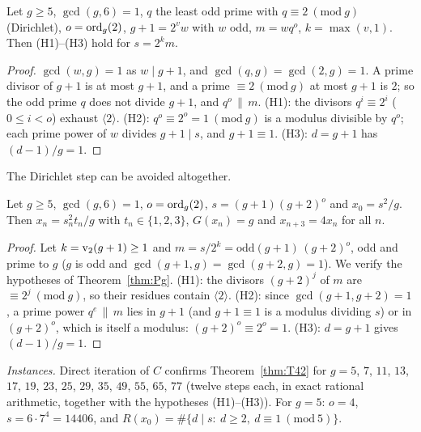 \begin{proposition}\label{prop:T38a}
Let \(g\ge5\), \(\gcd(g,6)=1\), \(q\) the least odd prime with \(q\equiv2\ (\mathrm{mod}\ g)\) (Dirichlet), \(o=\operatorname{ord}_g(2)\), \(g+1=2^vw\) with \(w\) odd, \(m=wq^o\), \(k=\max(v,1)\). Then (H1)--(H3) hold for \(s=2^km\).
\end{proposition}
\begin{proof}
\(\gcd(w,g)=1\) as \(w\mid g+1\), and \(\gcd(q,g)=\gcd(2,g)=1\). A prime divisor of \(g+1\) is at most \(g+1\), and a prime \(\equiv2\ (\mathrm{mod}\ g)\) at most \(g+1\) is \(2\); so the odd prime \(q\) does not divide \(g+1\), and \(q^o\,\|\,m\). (H1): the divisors \(q^i\equiv2^i\) (\(0\le i<o\)) exhaust \(\langle2\rangle\). (H2): \(q^o\equiv2^o=1\ (\mathrm{mod}\ g)\) is a modulus divisible by \(q^o\); each prime power of \(w\) divides \(g+1\mid s\), and \(g+1\equiv1\). (H3): \(d=g+1\) has \((d-1)/g=1\).
\end{proof}

The Dirichlet step can be avoided altogether.

\begin{theorem}\label{thm:T42}
Let \(g\ge5\), \(\gcd(g,6)=1\), \(o=\operatorname{ord}_g(2)\), \(s=(g+1)(g+2)^o\) and \(x_0=s^2/g\). Then \(x_n=s_n^2t_n/g\) with \(t_n\in\{1,2,3\}\), \(G(x_n)=g\) and \(x_{n+3}=4x_n\) for all \(n\).
\end{theorem}
\begin{proof}
Let \(k=\operatorname{v}_2(g+1)\ge1\) and \(m=s/2^k=\mathrm{odd}(g+1)\,(g+2)^o\), odd and prime to \(g\) (\(g\) is odd and \(\gcd(g+1,g)=\gcd(g+2,g)=1\)). We verify the hypotheses of Theorem~\ref{thm:Pg}. (H1): the divisors \((g+2)^j\) of \(m\) are \(\equiv2^j\ (\mathrm{mod}\ g)\), so their residues contain \(\langle2\rangle\). (H2): since \(\gcd(g+1,g+2)=1\), a prime power \(q^e\,\|\,m\) lies in \(g+1\) (and \(g+1\equiv1\) is a modulus dividing \(s\)) or in \((g+2)^o\), which is itself a modulus: \((g+2)^o\equiv2^o=1\). (H3): \(d=g+1\) gives \((d-1)/g=1\).
\end{proof}

\emph{Instances.} Direct iteration of \(C\) confirms Theorem~\ref{thm:T42} for \(g=5\), \(7\), \(11\), \(13\), \(17\), \(19\), \(23\), \(25\), \(29\), \(35\), \(49\), \(55\), \(65\), \(77\) (twelve steps each, in exact rational arithmetic, together with the hypotheses (H1)--(H3)). For \(g=5\): \(o=4\), \(s=6\cdot7^4=14406\), and \(R(x_0)=\#\{d\mid s:\ d\ge2,\ d\equiv1\ (\mathrm{mod}\ 5)\}\).

